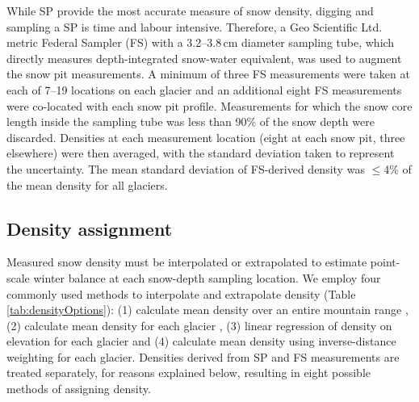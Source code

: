 \documentclass[twocolumn, letterpaper]{igs}
\begin{document}
While SP provide the most accurate measure of snow density, digging and sampling a SP is time and labour intensive. Therefore, a Geo Scientific Ltd. metric Federal Sampler (FS) \citep{Clyde1932} with a 3.2--3.8\,cm diameter sampling tube, which directly measures depth-integrated snow-water equivalent, was used to augment the snow pit measurements. A minimum of three FS measurements were taken at each of 7--19 locations on each glacier and an additional eight FS measurements were co-located with each snow pit profile. Measurements for which the snow core length inside the sampling tube was less than 90\% of the snow depth were discarded. Densities at each measurement location (eight at each snow pit, three elsewhere) were then averaged, with the standard deviation taken to represent the uncertainty. The mean standard deviation of FS-derived density was $\leq$4\% of the mean density for all glaciers.

\subsection{Density assignment}

Measured snow density must be interpolated or extrapolated to estimate point-scale winter balance at each snow-depth sampling location. We employ four commonly used methods to interpolate and extrapolate density (Table \ref{tab:densityOptions}): (1) calculate mean density over an entire mountain range \citep[e.g.][]{Cullen2017}, (2) calculate mean density for each glacier \citep[e.g.][]{Elder1991, McGrath2015}, (3) linear regression of density on elevation for each glacier \citep[e.g.][]{Elder1998, Molotch2005} and (4) calculate mean density using inverse-distance weighting \citep[e.g.][]{Molotch2005} for each glacier.  Densities derived from SP and FS measurements are treated separately, for reasons explained below, resulting in eight possible methods of assigning density.
\end{document}
